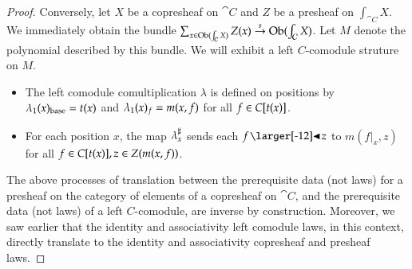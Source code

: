 \documentclass{amsart}
\begin{document}
\begin{proof}
  Conversely, let $X$ be a copresheaf on $\cat{C}$ and $Z$ be a
  presheaf on $\int_{\cat{C}}X$. We immediately obtain the bundle
  ${\sum_{x \in \operatorname{Ob}(\int_{\mathcal{C}}X)}Z(x) \overset{s}{\to}
    \operatorname{Ob}(\int_{\mathcal{C}}X)}$. Let $M$ denote the polynomial described by
  this bundle. We will exhibit a left $C$-comodule struture on $M$.
  \begin{itemize}
  \item The left comodule comultiplication $\lambda$ is defined on
    positions by ${\lambda}_1(x)_{\mathrm{base}} = t(x)$ and
    ${\lambda}_1(x)_f = m(x,f)$ for all ${f \in C[t(x)]}$.
  \item For each position $x$, the map ${\lambda}^\sharp_{x}$ sends each
    $f \subd z$ to $m(f|_x, z)$ for all
    ${f \in C[t(x)]}, {z \in Z(m(x,f))}$.
  \end{itemize}

  The above processes of translation between the prerequisite data
  (not laws) for a presheaf on the category of elements of a
  copresheaf on $\cat{C}$, and the prerequisite data (not laws) of a
  left $C$-comodule, are inverse by construction. Moreover, we saw
  earlier that the identity and associativity left comodule
  laws, in this context, directly translate to the identity and
  associativity copresheaf and presheaf laws.
\end{proof}
\end{document}
